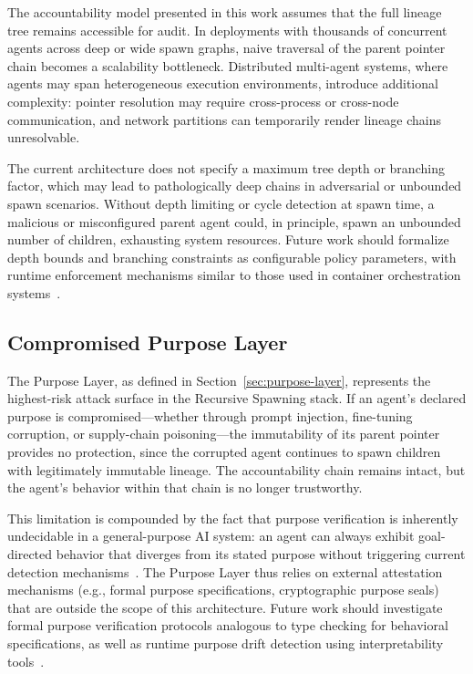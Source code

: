 The accountability model presented in this work assumes that the full lineage tree remains accessible for audit. In deployments with thousands of concurrent agents across deep or wide spawn graphs, naive traversal of the parent pointer chain becomes a scalability bottleneck. Distributed multi-agent systems, where agents may span heterogeneous execution environments, introduce additional complexity: pointer resolution may require cross-process or cross-node communication, and network partitions can temporarily render lineage chains unresolvable.

The current architecture does not specify a maximum tree depth or branching factor, which may lead to pathologically deep chains in adversarial or unbounded spawn scenarios. Without depth limiting or cycle detection at spawn time, a malicious or misconfigured parent agent could, in principle, spawn an unbounded number of children, exhausting system resources. Future work should formalize depth bounds and branching constraints as configurable policy parameters, with runtime enforcement mechanisms similar to those used in container orchestration systems~\cite{brewer2015kubernetes}.

\subsection{Compromised Purpose Layer}
\label{sec:limitations:purpose-layer}

The Purpose Layer, as defined in Section~\ref{sec:purpose-layer}, represents the highest-risk attack surface in the Recursive Spawning stack. If an agent's declared purpose is compromised—whether through prompt injection, fine-tuning corruption, or supply-chain poisoning—the immutability of its parent pointer provides no protection, since the corrupted agent continues to spawn children with legitimately immutable lineage. The accountability chain remains intact, but the agent's behavior within that chain is no longer trustworthy.

This limitation is compounded by the fact that purpose verification is inherently undecidable in a general-purpose AI system: an agent can always exhibit goal-directed behavior that diverges from its stated purpose without triggering current detection mechanisms~\cite{russell2019human}. The Purpose Layer thus relies on external attestation mechanisms (e.g., formal purpose specifications, cryptographic purpose seals) that are outside the scope of this architecture. Future work should investigate formal purpose verification protocols analogous to type checking for behavioral specifications, as well as runtime purpose drift detection using interpretability tools~\cite{olah2017visualization}.

